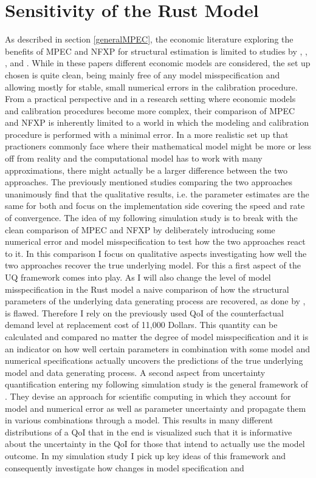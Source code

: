 \section{Sensitivity of the Rust Model}
\thispagestyle{plain} %

As described in section \ref{generalMPEC}, the economic literature exploring the benefits of MPEC and NFXP for structural estimation is limited to studies by \cite{Su.Judd.2012}, \cite{Dube.Fox.Su.2012}, \cite{Jorgensen.2013}, \cite{Iskhakov.2016} and \cite{Dong.Hsieh.Zhang.2017}. While in these papers different economic models are considered, the set up chosen is quite clean, being mainly free of any model misspecification and allowing mostly for stable, small numerical errors in the calibration procedure. From a practical perspective and in a research setting where economic models and calibration procedures become more complex, their comparison of MPEC and NFXP is inherently limited to a world in which the modeling and calibration procedure is performed with a minimal error. In a more realistic set up that practioners commonly face where their mathematical model might be more or less off from reality and the computational model has to work with many approximations, there might actually be a larger difference between the two approaches. The previously mentioned studies comparing the two approaches unanimously find that the qualitative results, i.e. the parameter estimates are the same for both and focus on the implementation side covering the speed and rate of convergence. The idea of my following simulation study is to break with the clean comparison of MPEC and NFXP by deliberately introducing some numerical error and model misspecification to test how the two approaches react to it. In this comparison I focus on qualitative aspects investigating how well the two approaches recover the true underlying model. For this a first aspect of the UQ framework comes into play. As I will also change the level of model misspecification in the Rust model a naive comparison of how the structural parameters of the underlying data generating process are recovered, as done by \cite{Su.Judd.2012}, is flawed. Therefore I rely on the previously used QoI of the counterfactual demand level at replacement cost of 11,000 Dollars. This quantity can be calculated and compared no matter the degree of model misspecification and it is an indicator on how well certain parameters in combination with some model and numerical specifications actually uncovers the predictions of the true underlying model and data generating process. A second aspect from uncertainty quantification entering my following simulation study is the general framework of \cite{Oberkampf.2010}. They devise an approach for scientific computing in which they account for model and numerical error as well as parameter uncertainty and propagate them in various combinations through a model. This results in many different distributions of a QoI that in the end is visualized such that it is informative about the uncertainty in the QoI for those that intend to actually use the model outcome. In my simulation study I pick up key ideas of this framework and consequently investigate how changes in model specification and 